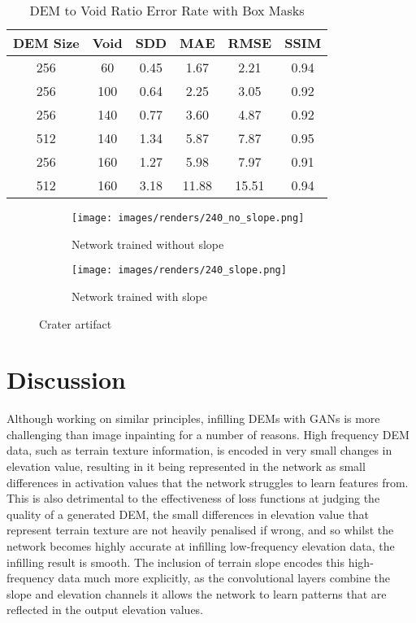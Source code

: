 \documentclass[twocolumn]{article}
\begin{document}
\begin{table}[htbp]
\caption{\label{table:void_size}DEM to Void Ratio Error Rate with Box Masks}
\centering
\begin{tabular}{cccccc}
DEM Size & Void & SDD & MAE & RMSE & SSIM\\[0pt]
\hline
256 & 60 & 0.45 & 1.67 & 2.21 & 0.94\\[0pt]
256 & 100 & 0.64 & 2.25 & 3.05 & 0.92\\[0pt]
256 & 140 & 0.77 & 3.60 & 4.87 & 0.92\\[0pt]
512 & 140 & 1.34 & 5.87 & 7.87 & 0.95\\[0pt]
256 & 160 & 1.27 & 5.98 & 7.97 & 0.91\\[0pt]
512 & 160 & 3.18 & 11.88 & 15.51 & 0.94\\[0pt]
\end{tabular}
\end{table}


\begin{figure}
\begin{subfigure}{1\columnwidth}
  \caption{Network trained without slope}
  \texttt{[image: images/renders/240\_no\_slope.png]}
  \label{fig:240_no_slope}
\end{subfigure}
\hfill
\begin{subfigure}{1\columnwidth}
  \caption{Network trained with slope}
  \texttt{[image: images/renders/240\_slope.png]}
  \label{fig:240_slope}
\end{subfigure}

\caption{Crater artifact}
\label{fig:crater_artifact}
\end{figure}

\section{Discussion}
\label{sec:orge16de7b}

Although working on similar principles, infilling DEMs with GANs is more challenging than image inpainting for a number of reasons.
High frequency DEM data, such as terrain texture information, is encoded in very small changes in elevation value, resulting in it being represented in the network as small differences in activation values that the network struggles to learn features from.
This is also detrimental to the effectiveness of loss functions at judging the quality of a generated DEM, the small differences in elevation value that represent terrain texture are not heavily penalised if wrong, and so whilst the network becomes highly accurate at infilling low-frequency elevation data, the infilling result is smooth.
The inclusion of terrain slope encodes this high-frequency data much more explicitly, as the convolutional layers combine the slope and elevation channels it allows the network to learn patterns that are reflected in the output elevation values.
\end{document}
